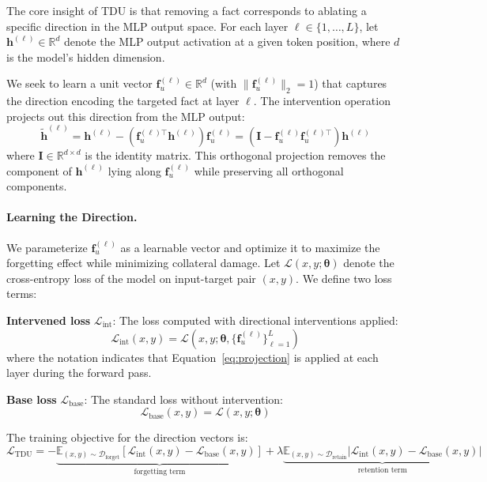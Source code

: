 The core insight of TDU is that removing a fact corresponds to ablating a specific direction in the MLP output space. For each layer $\ell \in \{1, \ldots, L\}$, let $\mathbf{h}^{(\ell)} \in \mathbb{R}^d$ denote the MLP output activation at a given token position, where $d$ is the model's hidden dimension.

We seek to learn a unit vector $\mathbf{f}_u^{(\ell)} \in \mathbb{R}^d$ (with $\|\mathbf{f}_u^{(\ell)}\|_2 = 1$) that captures the direction encoding the targeted fact at layer $\ell$. The intervention operation projects out this direction from the MLP output:
\begin{equation}
    \tilde{\mathbf{h}}^{(\ell)} = \mathbf{h}^{(\ell)} - \left(\mathbf{f}_u^{(\ell)\top} \mathbf{h}^{(\ell)}\right) \mathbf{f}_u^{(\ell)} = \left(\mathbf{I} - \mathbf{f}_u^{(\ell)} \mathbf{f}_u^{(\ell)\top}\right) \mathbf{h}^{(\ell)}
    \label{eq:projection}
\end{equation}
where $\mathbf{I} \in \mathbb{R}^{d \times d}$ is the identity matrix. This orthogonal projection removes the component of $\mathbf{h}^{(\ell)}$ lying along $\mathbf{f}_u^{(\ell)}$ while preserving all orthogonal components.

\paragraph{Learning the Direction.}
We parameterize $\mathbf{f}_u^{(\ell)}$ as a learnable vector and optimize it to maximize the forgetting effect while minimizing collateral damage. Let $\mathcal{L}(x, y; \bm{\theta})$ denote the cross-entropy loss of the model on input-target pair $(x, y)$. We define two loss terms:

\textbf{Intervened loss} $\mathcal{L}_{\text{int}}$: The loss computed with directional interventions applied:
\begin{equation}
    \mathcal{L}_{\text{int}}(x, y) = \mathcal{L}\left(x, y; \bm{\theta}, \{\mathbf{f}_u^{(\ell)}\}_{\ell=1}^L\right)
\end{equation}
where the notation indicates that Equation~\ref{eq:projection} is applied at each layer during the forward pass.

\textbf{Base loss} $\mathcal{L}_{\text{base}}$: The standard loss without intervention:
\begin{equation}
    \mathcal{L}_{\text{base}}(x, y) = \mathcal{L}(x, y; \bm{\theta})
\end{equation}

The training objective for the direction vectors is:
\begin{equation}
    \mathcal{L}_{\text{TDU}} = -\underbrace{\mathbb{E}_{(x,y) \sim \mathcal{D}_{\text{forget}}}\left[\mathcal{L}_{\text{int}}(x, y) - \mathcal{L}_{\text{base}}(x, y)\right]}_{\text{forgetting term}} + \lambda \underbrace{\mathbb{E}_{(x,y) \sim \mathcal{D}_{\text{retain}}}\left|\mathcal{L}_{\text{int}}(x, y) - \mathcal{L}_{\text{base}}(x, y)\right|}_{\text{retention term}}
    \label{eq:loss}
\end{equation}

